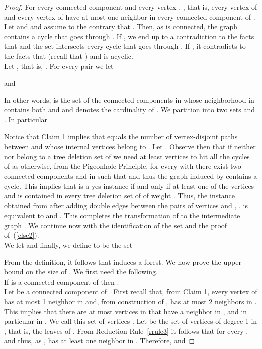 \documentclass[a4paper,11pt]{article}
\begin{document}
\begin{proof}
 For every connected component  and every vertex , , that is, 
every vertex  of  and every vertex  of  have at most one neighbor in every connected component  of .\\

 Let  and  and assume to the contrary that . 
Then, as  is connected, the graph  contains a cycle that goes through .
 If , we end up to a contradiction to the facts that 
 and the set  intersects every cycle that goes through . If , it contradicts to the facts that 
  (recall that ) and  is acyclic. \hfill \\
 

\noindent Let , that is, 
. For every pair  we let 

and

In other words,  is the set of the connected components in  
whose neighborhood in  contains both  and  and  denotes the cardinality of . We partition  into 
two sets  and . In particular


\noindent Notice that Claim 1 implies that  equals the number of vertex-disjoint 
paths between  and  whose internal vertices belong to  .
Let . 
Observe then that if neither  nor  belong to a tree deletion set of  we need at least  vertices to hit all the cycles 
of  as otherwise, from the Pigeonhole Principle, for every  with  
there exist two connected components  and  in  
such that  and thus the graph induced by  contains a cycle.
This implies that  is a yes instance if and only if at least one of the vertices  and  is contained
in every tree deletion set of  of weight . Thus, the instance  obtained from  after adding
double edges between the pairs of vertices  and , , is equivalent to  and .
This completes the transformation of  to the intermediate graph . We continue now with the identification of the set 
and the proof of~(\ref{clse2}).\\

\noindent We let  and finally, we define  to be the set 

\noindent From the definition, it follows that  induces a forest. We now prove the upper bound on the size of . We first need the following.\\

If  is a connected component of  then .\\

Let  be a connected component of . 
First recall that, from Claim 1, every vertex of  has at most 1 neighbor in  and, from construction of , 
 has at most 2 neighbors in . This implies that there are at most  vertices in  that have a 
neighbor in , and in particular in . We call this set of vertices .
Let  be the set of vertices of degree 1 in , that is, the leaves of . From Reduction Rule~\ref{rrule3} it follows that for every ,  and thus, as ,  has at least one neighbor in . Therefore,  and 


\end{proof}
\end{document}
